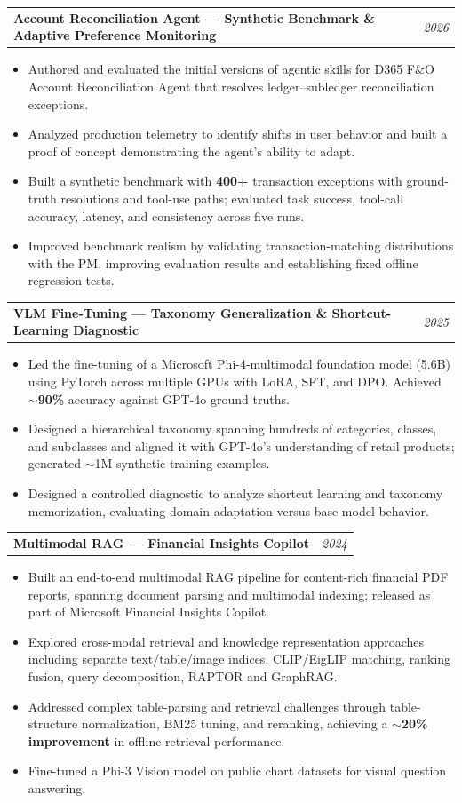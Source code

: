 \documentclass[10pt,letterpaper]{article}
\makeatletter
\newcommand{\heading}[2]{\vspace{2pt}\begin{tabularx}{\textwidth}{@{}Xr@{}}\textbf{#1} & \textit{#2}\end{tabularx}\vspace{-0pt}}
\makeatother
\begin{document}
\heading{Account Reconciliation Agent --- Synthetic Benchmark \& Adaptive Preference Monitoring}{2026}
\begin{itemize}
\item Authored and evaluated the initial versions of agentic skills for D365 F\&O Account Reconciliation Agent that resolves ledger--subledger reconciliation exceptions.
\item Analyzed production telemetry to identify shifts in user behavior and built a proof of concept demonstrating the agent's ability to adapt.
\item Built a synthetic benchmark with \textbf{400+} transaction exceptions with ground-truth resolutions and tool-use paths; evaluated task success, tool-call accuracy, latency, and consistency across five runs.
\item Improved benchmark realism by validating transaction-matching distributions with the PM, improving evaluation results and establishing fixed offline regression tests.
\end{itemize}

\heading{VLM Fine-Tuning --- Taxonomy Generalization \& Shortcut-Learning Diagnostic}{2025}
\begin{itemize}
\item Led the fine-tuning of a Microsoft Phi-4-multimodal foundation model (5.6B) using PyTorch across multiple GPUs with LoRA, SFT, and DPO. Achieved \textbf{$\sim$90\%} accuracy against GPT-4o ground truths.
\item Designed a hierarchical taxonomy spanning hundreds of categories, classes, and subclasses and aligned it with GPT-4o's understanding of retail products; generated $\sim$1M synthetic training examples.
\item Designed a controlled diagnostic to analyze shortcut learning and taxonomy memorization, evaluating domain adaptation versus base model behavior.
\end{itemize}

\heading{Multimodal RAG --- Financial Insights Copilot}{2024}
\begin{itemize}
\item Built an end-to-end multimodal RAG pipeline for content-rich financial PDF reports, spanning document parsing and multimodal indexing; released as part of Microsoft Financial Insights Copilot.
\item Explored cross-modal retrieval and knowledge representation approaches including separate text/table/image indices, CLIP/EigLIP matching, ranking fusion, query decomposition, RAPTOR and GraphRAG.
\item Addressed complex table-parsing and retrieval challenges through table-structure normalization, BM25 tuning, and reranking, achieving a \textbf{$\sim$20\% improvement} in offline retrieval performance.
\item Fine-tuned a Phi-3 Vision model on public chart datasets for visual question answering.
\end{itemize}
\end{document}
